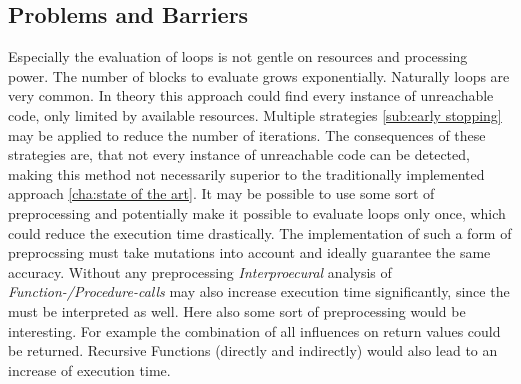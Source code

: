 \subsection{Problems and Barriers}
\label{sub:problems and barriers}
Especially the evaluation of loops is not gentle on resources and processing power. The number of blocks to evaluate grows exponentially. Naturally loops are very common. In theory this approach could find every instance of unreachable code, only limited by available resources. Multiple strategies \ref{sub:early stopping}  may be applied to reduce the number of iterations.
The consequences of these strategies are, that not every instance of unreachable code can be detected, making this method not necessarily superior to the traditionally implemented approach \ref{cha:state of the art}. 
It may be possible to use some sort of preprocessing and potentially make it possible to evaluate loops only once, which could reduce the execution time drastically.
The implementation of such a form of preprocssing must take mutations into account and ideally guarantee the same accuracy.
Without any preprocessing \emph{Interproecural} analysis of \emph{Function-/Procedure-calls} may also increase execution time significantly, since the must be interpreted as well. Here also some sort of preprocessing would be interesting. For example the combination of all influences on return values could be returned. 
Recursive Functions (directly and indirectly) would also lead to an increase of execution time.
